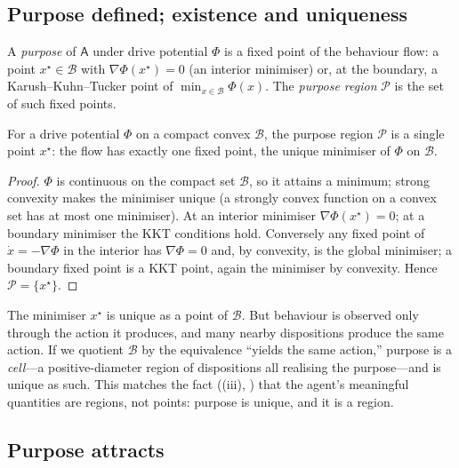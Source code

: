 \documentclass[11pt,twocolumn,a4paper]{article}
\newcommand{\Agent}{\mathsf{A}}
\newcommand{\Beh}{\mathcal{B}}       %
\newcommand{\Purp}{\mathcal{P}}      %
\begin{document}
\subsection{Purpose defined; existence and uniqueness}

\begin{definition}[Purpose]
\label{def:purpose}
A \emph{purpose} of $\Agent$ under drive potential $\Phi$ is a fixed point
of the behaviour flow: a point $x^\star\in\Beh$ with
$\nabla\Phi(x^\star)=0$ (an interior minimiser) or, at the boundary, a
Karush--Kuhn--Tucker point of $\min_{x\in\Beh}\Phi(x)$. The \emph{purpose
region} $\Purp$ is the set of such fixed points.
\end{definition}

\begin{theorem}
\label{thm:purpexist}
For a drive potential $\Phi$ on a compact convex $\Beh$, the purpose
region $\Purp$ is a single point $x^\star$: the flow has exactly one fixed
point, the unique minimiser of $\Phi$ on $\Beh$.
\end{theorem}

\begin{proof}
$\Phi$ is continuous on the compact set $\Beh$, so it attains a minimum;
strong convexity makes the minimiser unique (a strongly convex function on
a convex set has at most one minimiser). At an interior minimiser
$\nabla\Phi(x^\star)=0$; at a boundary minimiser the KKT conditions hold.
Conversely any fixed point of $\dot x=-\nabla\Phi$ in the interior has
$\nabla\Phi=0$ and, by convexity, is the global minimiser; a boundary
fixed point is a KKT point, again the minimiser by convexity. Hence
$\Purp=\{x^\star\}$.
\end{proof}

\begin{remark}
\label{rem:equiv}
The minimiser $x^\star$ is unique as a point of $\Beh$. But behaviour is
observed only through the action it produces, and many nearby dispositions
produce the same action. If we quotient $\Beh$ by the equivalence ``yields
the same action,'' purpose is a \emph{cell}---a positive-diameter region
of dispositions all realising the purpose---and is unique as such. This
matches the fact ((iii), ) that
the agent's meaningful quantities are regions, not points: purpose is
unique, and it is a region.
\end{remark}

\subsection{Purpose attracts}
\end{document}
